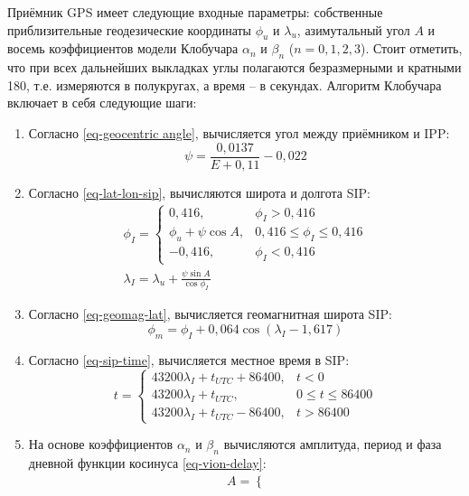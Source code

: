 Приёмник GPS имеет следующие входные параметры: собственные приблизительные геодезические координаты $\phi_u$ и $\lambda_u$, азимутальный угол $A$ и восемь коэффициентов модели Клобучара $\alpha_n$ и $\beta_n$ ($n=0,1,2,3$).
Стоит отметить, что при всех дальнейших выкладках углы полагаются безразмерными и кратными 180\degree, т.е. измеряются в полукругах, а время -- в секундах.
Алгоритм Клобучара включает в себя следующие шаги:
\begin{enumerate}
\item Согласно \eqref{eq-geocentric angle}, вычисляется угол между приёмником и IPP:
\begin{equation}
\psi=\frac{0,0137}{E+0,11}-0,022
\end{equation}
\item Согласно \eqref{eq-lat-lon-sip}, вычисляются широта и долгота SIP:
\begin{equation}
\begin{gathered}
\phi_I=\begin{cases}
0,416,&\phi_I>0,416 \\
\phi_u+\psi\cos A,&0,416\leqslant\phi_I\leqslant 0,416\\
-0,416,&\phi_I<0,416
\end{cases} \\
\lambda_I=\lambda_u+\frac{\psi\sin A}{\cos\phi_I}
\end{gathered}
\end{equation}
\item Согласно \eqref{eq-geomag-lat}, вычисляется геомагнитная широта SIP:
\begin{equation}
\phi_m=\phi_I+0,064\cos(\lambda_I-1,617)
\end{equation}
\item Согласно \eqref{eq-sip-time}, вычисляется местное время в SIP:
\begin{equation}
t=\begin{cases}
43200\lambda_I+t_{UTC}+86400,&t<0 \\
43200\lambda_I+t_{UTC},&0\leqslant t\leqslant 86400 \\
43200\lambda_I+t_{UTC}-86400,&t>86400    
\end{cases}
\end{equation}
\item На основе коэффициентов $\alpha_n$ и $\beta_n$ вычисляются амплитуда, период и фаза дневной функции косинуса \eqref{eq-vion-delay}:
\begin{equation}
\begin{aligned}
&A=\begin{cases}

\end{cases}
\end{aligned}
\end{equation}
\end{enumerate}
